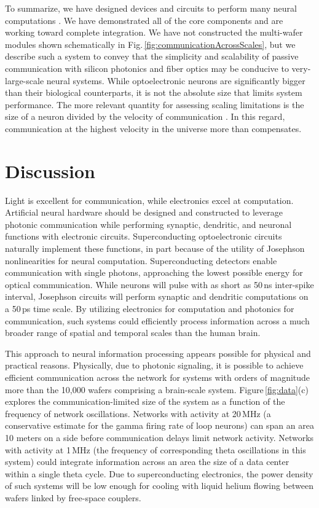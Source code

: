 \documentclass[twocolumn]{article}
\begin{document}
To summarize, we have designed devices and circuits to perform many neural computations \cite{sh2018,sh2018_full}. We have demonstrated all of the core components and are working toward complete integration. We have not constructed the multi-wafer modules shown schematically in Fig.\,\ref{fig:communicationAcrossScales}, but we describe such a system to convey that the simplicity and scalability of passive communication with silicon photonics and fiber optics may be conducive to very-large-scale neural systems. While optoelectronic neurons are significantly bigger than their biological counterparts, it is not the absolute size that limits system performance. The more relevant quantity for assessing scaling limitations is the size of a neuron divided by the velocity of communication \cite{shICRC2018}. In this regard, communication at the highest velocity in the universe more than compensates.

\section{\label{sec:discussion}Discussion}
Light is excellent for communication, while electronics excel at computation. Artificial neural hardware should be designed and constructed to leverage photonic communication while performing synaptic, dendritic, and neuronal functions with electronic circuits. Superconducting optoelectronic circuits naturally implement these functions, in part because of the utility of Josephson nonlinearities for neural computation. Superconducting detectors enable communication with single photons, approaching the lowest possible energy for optical communication. While neurons will pulse with as short as 50\,ns inter-spike interval, Josephson circuits will perform synaptic and dendritic computations on a 50\,ps time scale. By utilizing electronics for computation and photonics for communication, such systems could efficiently process information across a much broader range of spatial and temporal scales than the human brain.

This approach to neural information processing appears possible for physical and practical reasons. Physically, due to photonic signaling, it is possible to achieve efficient communication across the network for systems with orders of magnitude more than the 10,000 wafers comprising a brain-scale system. Figure\,\ref{fig:data}(c) explores the communication-limited size of the system as a function of the frequency of network oscillations. Networks with activity at 20\,MHz (a conservative estimate for the gamma firing rate of loop neurons) can span an area 10 meters on a side before communication delays limit network activity. Networks with activity at 1\,MHz (the frequency of corresponding theta oscillations in this system) could integrate information across an area the size of a data center within a single theta cycle. Due to superconducting electronics, the power density of such systems will be low enough for cooling with liquid helium flowing between wafers linked by free-space couplers. 
\end{document}
